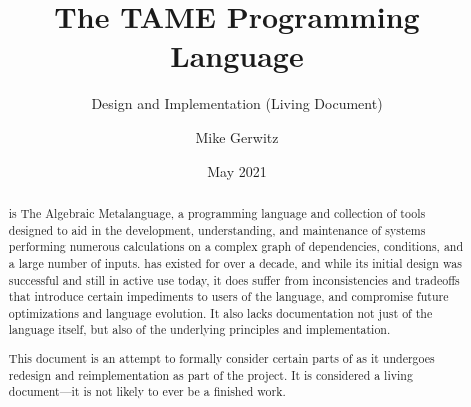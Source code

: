 \documentclass[draft,toc=index]{scrartcl}
\title{The TAME Programming Language}
\subtitle{Design and Implementation (Living Document)}
\author{Mike Gerwitz}
\date{May 2021}%
\begin{document}
\maketitle

\begin{abstract}
  \tame{} is The Algebraic Metalanguage, a programming language and
  collection of tools designed to aid in the development, understanding,
  and maintenance of systems performing numerous calculations on a
  complex graph of dependencies, conditions, and a large number of
  inputs.  \tame{} has existed for over a decade, and while its initial
  design was successful and still in active use today, it does suffer
  from inconsistencies and tradeoffs that introduce certain impediments
  to users of the language, and compromise future optimizations and
  language evolution.  It also lacks documentation not just of the
  language itself, but also of the underlying principles and
  implementation.

  This document is an attempt to formally consider certain parts of
  \tame{} as it undergoes redesign and reimplementation as part of the
  \tamer{} project.  It is considered a living document---it is not
  likely to ever be a finished work.
\end{abstract}


\tableofcontents





\iftplappendix
 \clearpage
 \appendix
 
\fi

\cfoot[\thepage]{\thepage}

\printbibliography[heading=bibintoc]

\clearpage
\printindex
\end{document}
